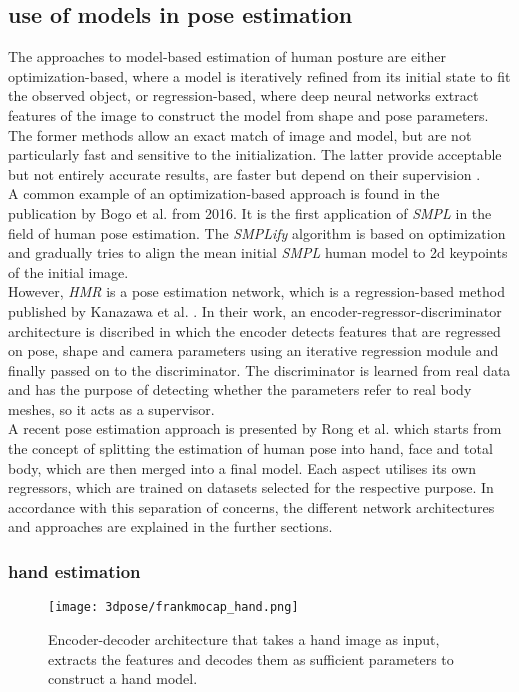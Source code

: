 \subsection{use of models in pose estimation}
The approaches to model-based estimation of human posture are either optimization-based, where a model is iteratively refined from its initial state to fit the observed object, or regression-based, where deep neural networks extract features of the image to construct the model from shape and pose parameters. The former methods allow an exact match of image and model, but are not particularly fast and sensitive to the initialization. The latter provide acceptable but not entirely accurate results, are faster but depend on their supervision \cite{spin}. \\
A common example of an optimization-based approach is found in the publication by Bogo et al. \cite{simplify} from 2016. It is the first application of \emph{SMPL} in the field of human pose estimation. The \emph{SMPLify} algorithm is based on optimization and gradually tries to align the mean initial \emph{SMPL} human model to 2d keypoints of the initial image. \\
However, \emph{HMR} is a pose estimation network, which is a regression-based method published by Kanazawa et al. \cite{hmr}. In their work, an encoder-regressor-discriminator architecture is discribed in which the encoder detects features that are regressed on pose, shape and camera parameters using an iterative regression module and finally passed on to the discriminator. The discriminator is learned from real data and has the purpose of detecting whether the parameters refer to real body meshes, so it acts as a supervisor. \\
A recent pose estimation approach is presented by Rong et al. \cite{frankmocap} which starts from the concept of splitting the estimation of human pose into hand, face and total body, which are then merged into a final model. Each aspect utilises its own regressors, which are trained on datasets selected for the respective purpose. In accordance with this separation of concerns, the different network architectures and approaches are explained in the further sections.

\subsubsection{hand estimation}
\begin{figure}[h]
	\centering
	\texttt{[image: 3dpose/frankmocap\_hand.png]}
	\caption{Encoder-decoder architecture that takes a hand image as input, extracts the features and decodes them as sufficient parameters to construct a hand model.\cite{frankmocap}}
	\label{fig:frankmocap_hand}
\end{figure}

